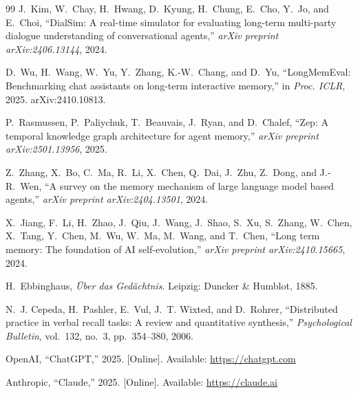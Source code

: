 \documentclass[conference]{IEEEtran}
\begin{document}
\begin{thebibliography}{99}
J.~Kim, W.~Chay, H.~Hwang, D.~Kyung, H.~Chung, E.~Cho, Y.~Jo, and E.~Choi, ``DialSim: A real-time simulator for evaluating long-term multi-party dialogue understanding of conversational agents,'' \emph{arXiv preprint arXiv:2406.13144}, 2024.

D.~Wu, H.~Wang, W.~Yu, Y.~Zhang, K.-W.~Chang, and D.~Yu, ``LongMemEval: Benchmarking chat assistants on long-term interactive memory,'' in \emph{Proc. ICLR}, 2025. arXiv:2410.10813.

P.~Rasmussen, P.~Paliychuk, T.~Beauvais, J.~Ryan, and D.~Chalef, ``Zep: A temporal knowledge graph architecture for agent memory,'' \emph{arXiv preprint arXiv:2501.13956}, 2025.

Z.~Zhang, X.~Bo, C.~Ma, R.~Li, X.~Chen, Q.~Dai, J.~Zhu, Z.~Dong, and J.-R.~Wen, ``A survey on the memory mechanism of large language model based agents,'' \emph{arXiv preprint arXiv:2404.13501}, 2024.

X.~Jiang, F.~Li, H.~Zhao, J.~Qiu, J.~Wang, J.~Shao, S.~Xu, S.~Zhang, W.~Chen, X.~Tang, Y.~Chen, M.~Wu, W.~Ma, M.~Wang, and T.~Chen, ``Long term memory: The foundation of AI self-evolution,'' \emph{arXiv preprint arXiv:2410.15665}, 2024.

H.~Ebbinghaus, \emph{{\"U}ber das Ged{\"a}chtnis}. Leipzig: Duncker \& Humblot, 1885.

N.~J. Cepeda, H.~Pashler, E.~Vul, J.~T. Wixted, and D.~Rohrer, ``Distributed practice in verbal recall tasks: A review and quantitative synthesis,'' \emph{Psychological Bulletin}, vol.~132, no.~3, pp.~354--380, 2006.

OpenAI, ``ChatGPT,'' 2025. [Online]. Available: \url{https://chatgpt.com}

Anthropic, ``Claude,'' 2025. [Online]. Available: \url{https://claude.ai}

\end{thebibliography}
\end{document}
